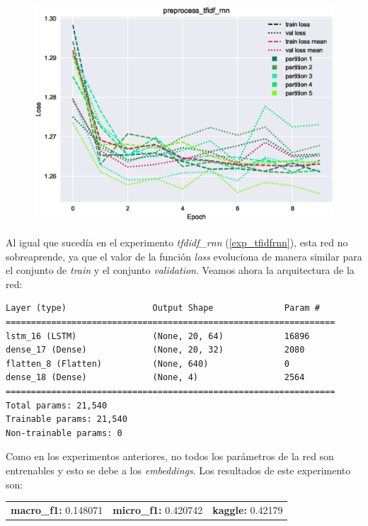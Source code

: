\documentclass[11pt]{article}
\begin{document}
\begin{figure}[H]
\includegraphics[width=\linewidth]{images/loss/preprocess_tfidf_rnn-1554206135.eps}
\end{figure}

Al igual que sucedía en el experimento \textit{tfdidf\_rnn} (\ref{exp_tfidfrnn}), esta red no sobreaprende, ya que el valor de la función \textit{loss} evoluciona de manera similar para el conjunto de \textit{train} y el conjunto \textit{validation}. Veamos ahora la arquitectura de la red:

\begin{verbatim}
Layer (type)                 Output Shape              Param #   
=================================================================
lstm_16 (LSTM)               (None, 20, 64)            16896     
dense_17 (Dense)             (None, 20, 32)            2080      
flatten_8 (Flatten)          (None, 640)               0         
dense_18 (Dense)             (None, 4)                 2564      
=================================================================
Total params: 21,540
Trainable params: 21,540
Non-trainable params: 0
\end{verbatim}

Como en los experimentos anteriores, no todos los parámetros de la red son entrenables y esto se debe a los \textit{embeddings}. Los resultados de este experimento son: 

\begin{table}[H]
\begin{tabular}{c|c|c}
\textbf{macro\_f1:} 0.148071 & \textbf{micro\_f1:} 0.420742 & \textbf{kaggle:} 0.42179
\end{tabular}
\end{table}
\end{document}

